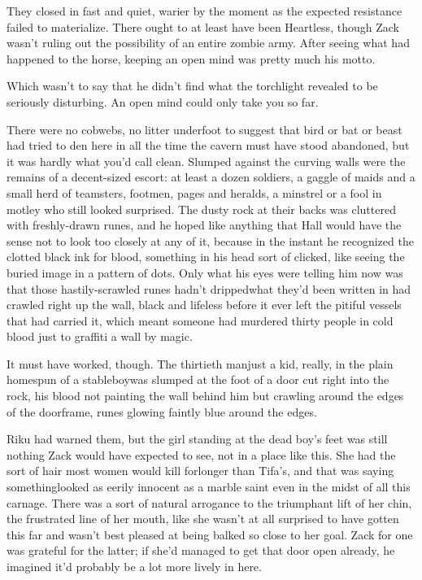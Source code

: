 They closed in fast and quiet, warier by the moment as the expected resistance failed to materialize. There ought to at least have been Heartless, though Zack wasn't ruling out the possibility of an entire zombie army. After seeing what had happened to the horse, keeping an open mind was pretty much his motto.

Which wasn't to say that he didn't find what the torchlight revealed to be seriously disturbing. An open mind could only take you so far.

There were no cobwebs, no litter underfoot to suggest that bird or bat or beast had tried to den here in all the time the cavern must have stood abandoned, but it was hardly what you'd call clean. Slumped against the curving walls were the remains of a decent-sized escort: at least a dozen soldiers, a gaggle of maids and a small herd of teamsters, footmen, pages and heralds, a minstrel or a fool in motley who still looked surprised. The dusty rock at their backs was cluttered with freshly-drawn runes, and he hoped like anything that Hall would have the sense not to look too closely at any of it, because in the instant he recognized the clotted black ink for blood, something in his head sort of clicked, like seeing the buried image in a pattern of dots. Only what his eyes were telling him now was that those hastily-scrawled runes hadn't dripped\textemdash what they'd been written in had crawled right up the wall, black and lifeless before it ever left the pitiful vessels that had carried it, which meant someone had murdered thirty people in cold blood just to graffiti a wall by magic.

It must have worked, though. The thirtieth man\textemdash just a kid, really, in the plain homespun of a stableboy\textemdash was slumped at the foot of a door cut right into the rock, his blood not painting the wall behind him but crawling around the edges of the doorframe, runes glowing faintly blue around the edges.

Riku had warned them, but the girl standing at the dead boy's feet was still nothing Zack would have expected to see, not in a place like this. She had the sort of hair most women would kill for\textemdash longer than Tifa's, and that was saying something\textemdash looked as eerily innocent as a marble saint even in the midst of all this carnage. There was a sort of natural arrogance to the triumphant lift of her chin, the frustrated line of her mouth, like she wasn't at all surprised to have gotten this far and wasn't best pleased at being balked so close to her goal. Zack for one was grateful for the latter; if she'd managed to get that door open already, he imagined it'd probably be a lot more lively in here.

